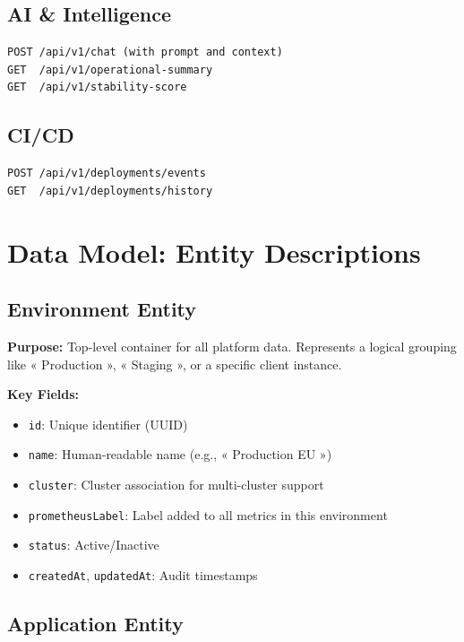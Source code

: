 \documentclass[12pt,a4paper]{report}
\begin{document}
\subsection{AI \& Intelligence}

\begin{verbatim}
POST /api/v1/chat (with prompt and context)
GET  /api/v1/operational-summary
GET  /api/v1/stability-score
\end{verbatim}

\subsection{CI/CD}

\begin{verbatim}
POST /api/v1/deployments/events
GET  /api/v1/deployments/history
\end{verbatim}

\section{Data Model: Entity Descriptions}\label{app:data_model}

\subsection{Environment Entity}

\begin{tcolorbox}
  \textbf{Purpose:} Top-level container for all platform data. Represents a logical grouping like « Production », « Staging », or a specific client instance.
  
  \textbf{Key Fields:}
  \begin{itemize}
    \item \texttt{id}: Unique identifier (UUID)
    \item \texttt{name}: Human-readable name (e.g., « Production EU »)
    \item \texttt{cluster}: Cluster association for multi-cluster support
    \item \texttt{prometheusLabel}: Label added to all metrics in this environment
    \item \texttt{status}: Active/Inactive
    \item \texttt{createdAt}, \texttt{updatedAt}: Audit timestamps
  \end{itemize}
\end{tcolorbox}

\subsection{Application Entity}
\end{document}
